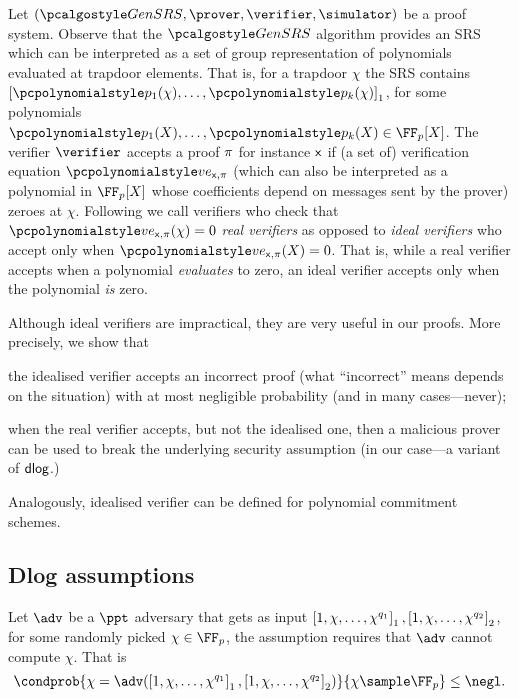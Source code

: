  Let
$(\kgen, \prover, \verifier, \simulator)$ be a proof system.
Observe that the $\kgen$ algorithm provides an SRS which can be interpreted as a set
of group representation of polynomials evaluated at trapdoor elements. That is, for a
trapdoor $\chi$ the SRS contains $\gone{\p{p_1}(\chi), \ldots, \p{p_k}(\chi)}$, for
some polynomials $\p{p_1}(X), \ldots, \p{p_k}(X) \in \FF_p[X]$. The verifier
$\verifier$ accepts a proof $\pi$ for instance $\mathsf{x}$ if (a set of) verification
equation $\vereq_{\inp, \zkproof}$ (which can also be interpreted as a polynomial in
$\FF_p[X]$ whose coefficients depend on messages sent by the prover) zeroes at
$\chi$. Following \cite{EPRINT:GabWilCio19} we call verifiers who check that
$\vereq_{\inp, \zkproof}(\chi) = 0$ \emph{real verifiers} as opposed to \emph{ideal
  verifiers} who accept only when $\vereq_{\inp, \zkproof}(X) = 0$. That is, while a
real verifier accepts when a polynomial \emph{evaluates} to zero, an ideal verifier
accepts only when the polynomial \emph{is} zero.

Although ideal verifiers are impractical, they are very useful in our
proofs. More precisely, we show that
\begin{compactenum}
\item the idealised verifier accepts an incorrect proof (what ``incorrect''
  means depends on the situation) with at most negligible probability (and in many
  cases---never);
\item when the real verifier accepts, but not the idealised one, then a malicious
  prover can be used to break the underlying security assumption (in our case---a
  variant of $\mathsf{dlog}$.)
\end{compactenum}

Analogously, idealised verifier can be defined for polynomial commitment schemes.

\subsection{Dlog assumptions}
\label{sec:dlog_assumptions}
\begin{definition}\label{def:dlog}
	Let $\adv$ be a $\ppt$ adversary that gets as input
  $\left[1, \chi, \ldots, \chi^{q_1}\right]_{1}, \left[1, \chi, \ldots, \chi^{q_2}\right]_{2}$, for
  some randomly picked $\chi \in \FF_p$, the assumption requires that $\adv$ cannot compute $\chi$. That is
	\[
		\condprob{\chi = \adv(\gone{1, \chi, \ldots, \chi^{q_1}}, \gtwo{1, \chi,
        \ldots, \chi^{q_2} })}{\chi \sample \FF_p} \leq \negl.
	\]
\end{definition}

